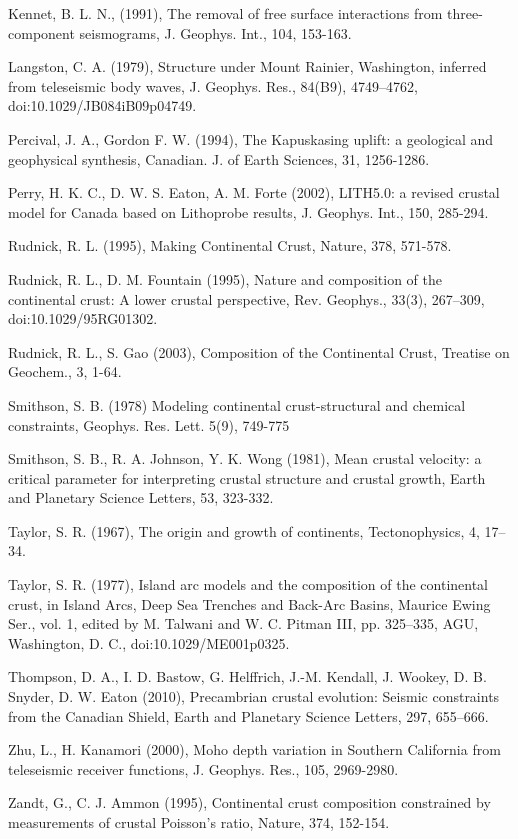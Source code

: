 \documentclass[draft, 12pt]{article}
\begin{document}
Kennet, B. L. N., (1991), The removal of free surface interactions from three-component seismograms, J. Geophys. Int., 104, 153-163.

Langston, C. A. (1979), Structure under Mount Rainier, Washington, inferred from teleseismic body waves, J. Geophys. Res., 84(B9), 4749–4762, doi:10.1029/JB084iB09p04749.

Percival, J. A., Gordon F. W. (1994), The Kapuskasing uplift: a geological and geophysical synthesis, Canadian. J. of Earth Sciences, 31, 1256-1286.

Perry, H. K. C., D. W. S. Eaton, A. M. Forte (2002), LITH5.0: a revised crustal model for Canada based on Lithoprobe results,  J. Geophys. Int., 150, 285-294.

Rudnick, R. L. (1995), Making Continental Crust, Nature, 378, 571-578.

Rudnick, R. L., D. M. Fountain (1995), Nature and composition of the continental crust: A lower crustal perspective, Rev. Geophys., 33(3), 267–309, doi:10.1029/95RG01302.

Rudnick, R. L., S. Gao (2003), Composition of the Continental Crust, Treatise on Geochem., 3, 1-64.

Smithson, S. B. (1978) Modeling continental crust-structural and chemical constraints, Geophys. Res. Lett. 5(9), 749-775

Smithson, S. B., R. A. Johnson, Y. K. Wong (1981), Mean crustal velocity: a critical parameter for interpreting crustal structure and crustal growth, Earth and Planetary Science Letters, 53, 323-332.

Taylor, S. R. (1967), The origin and growth of continents, Tectonophysics, 4, 17–34.

Taylor, S. R. (1977), Island arc models and the composition of the continental crust, in Island Arcs, Deep Sea Trenches and Back-Arc Basins, Maurice Ewing Ser., vol. 1, edited by M. Talwani and W. C. Pitman III, pp. 325–335, AGU, Washington, D. C., doi:10.1029/ME001p0325.

Thompson, D. A., I. D. Bastow, G. Helffrich, J.-M. Kendall, J. Wookey, D. B. Snyder, D. W. Eaton (2010), Precambrian crustal evolution: Seismic constraints from the Canadian Shield, Earth and Planetary Science Letters, 297, 655–666.

Zhu, L., H. Kanamori (2000), Moho depth variation in Southern California from teleseismic receiver functions, J. Geophys. Res., 105, 2969-2980.

Zandt, G., C. J. Ammon (1995), Continental crust composition constrained by measurements of crustal Poisson's ratio, Nature, 374, 152-154.
\end{document}

